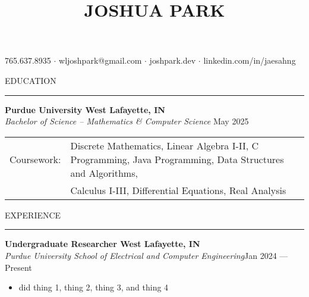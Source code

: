 \documentclass[letter,11pt]{article}
\begin{document}
\title{\Huge{JOSHUA PARK}}
\date{}
\maketitle
\vspace*{-6em}

\begin{center}\begin{small}
    765.637.8935 $\cdot$ wljoshpark@gmail.com $\cdot$ joshpark.dev $\cdot$ linkedin.com/in/jaesahng
\end{small}\end{center}

EDUCATION

\vspace*{-1.25em}
\rule{\textwidth}{1.2pt}
\textbf{Purdue University \hfill West Lafayette, IN}\\
\emph{Bachelor of Science -- Mathematics \& Computer Science} \hfill May 2025 \\
\begin{tabular}{@{}p{1.83cm}l}
    Coursework: & Discrete Mathematics, Linear Algebra I-II, C Programming, Java Programming, Data Structures and Algorithms,\\
    &Calculus I-III, Differential Equations, Real Analysis
\end{tabular}

EXPERIENCE

\vspace*{-1.25em}
\rule{\textwidth}{1.2pt}
\textbf{Undergraduate Researcher \hfill West Lafayette, IN}\\
\emph{Purdue University School of Electrical and Computer Engineering}\hfill Jan 2024 --- Present\\
\vspace*{-1.75em}
\begin{itemize}[label=-, leftmargin=*, labelwidth=1.5cm, align=left, noitemsep]
    \item did thing 1, thing 2, thing 3, and thing 4
\end{itemize}
\vspace*{-0.25em}
\end{document}
